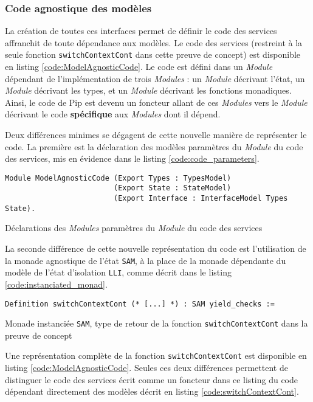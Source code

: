 			\subsubsection{Code agnostique des modèles}

			La création de toutes ces interfaces permet de définir le code des services affranchit de toute dépendance aux modèles. Le code des services (restreint à la seule fonction \texttt{switchContextCont} dans cette preuve de concept) est disponible en listing \ref{code:ModelAgnosticCode}. Le code est défini dans un \emph{Module} dépendant de l'implémentation de trois \emph{Modules} : un \emph{Module} décrivant l'état, un \emph{Module} décrivant les types, et un \emph{Module} décrivant les fonctions monadiques. Ainsi, le code de Pip est devenu un foncteur allant de ces \emph{Modules} vers le \emph{Module} décrivant le code \textbf{spécifique} aux \emph{Modules} dont il dépend.

Deux différences minimes se dégagent de cette nouvelle manière de représenter le code. La première est la déclaration des modèles paramètres du \emph{Module} du code des services, mis en évidence dans le listing \ref{code:code_parameters}. 
	\begin{listing}[!ht]
	\begin{verbatim}
Module ModelAgnosticCode (Export Types : TypesModel)
                         (Export State : StateModel)
                         (Export Interface : InterfaceModel Types State).
	\end{verbatim}
	\caption{Déclarations des \emph{Modules} paramètres du \emph{Module} du code des services}
	\label{code:code_parameters}
	\end{listing}

La seconde différence de cette nouvelle représentation du code est l'utilisation de la monade agnostique de l'état \texttt{SAM}, à la place de la monade dépendante du modèle de l'état d'isolation \texttt{LLI}, comme décrit dans le listing \ref{code:instanciated_monad}.

	\begin{listing}[!ht]
	\begin{verbatim}
Definition switchContextCont (* [...] *) : SAM yield_checks :=
	\end{verbatim}
	\caption{Monade instanciée \texttt{SAM}, type de retour de la fonction \texttt{switchContextCont} dans la preuve de concept}
	\label{code:instanciated_monad}
	\end{listing}

	Une représentation complète de la fonction \texttt{switchContextCont} est disponible en listing \ref{code:ModelAgnosticCode}. Seules ces deux différences permettent de distinguer le code des services écrit comme un foncteur dans ce listing du code dépendant directement des modèles décrit en listing \ref{code:switchContextCont}.


